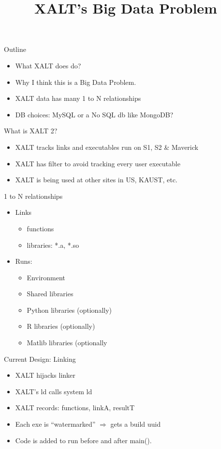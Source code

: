 \documentclass{beamer}
\begin{document}
\title[XALT]{XALT's Big Data Problem}
\frame{\titlepage} 

\begin{frame}{Outline}
  \begin{itemize}
    \item What XALT does do?
    \item Why I think this is a Big Data Problem.
    \item XALT data has many 1 to N relationships
    \item DB choices: MySQL or a No SQL db like MongoDB?
  \end{itemize}
\end{frame}

\begin{frame}{What is XALT 2?}
  \begin{itemize}
    \item XALT tracks links and executables run on S1, S2 \& Maverick
    \item XALT has filter to avoid tracking every user executable
    \item XALT is being used at other sites in US, KAUST, etc.
  \end{itemize}
\end{frame}

\begin{frame}{1 to N relationships}
  \begin{itemize}
    \item Links
      \begin{itemize}
        \item functions
        \item libraries: *.a, *.so
      \end{itemize}
    \item Runs:
      \begin{itemize}
        \item Environment
        \item Shared libraries
        \item Python libraries (optionally)
        \item R libraries (optionally)
        \item Matlib libraries (optionally
      \end{itemize}
  \end{itemize}
\end{frame}


\begin{frame}{Current Design: Linking}
  \begin{itemize}
    \item XALT hijacks linker
    \item XALT's ld calls system ld
    \item XALT records: functions, linkA, resultT
    \item Each exe is ``watermarked'' $\Rightarrow$ gets a build uuid
    \item Code is added to run before and after main().
  \end{itemize}
\end{frame}
\end{document}
